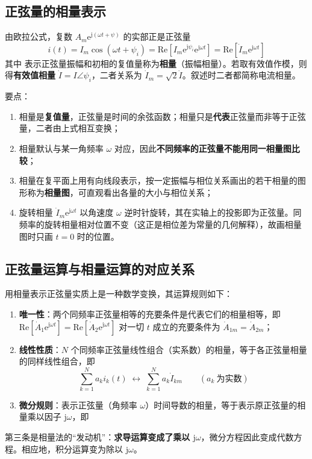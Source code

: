 \subsection{正弦量的相量表示}
由欧拉公式，复数 $A_m\mathrm{e}^{\mathrm{j}(\omega t+\psi)}$ 的实部正是正弦量
\begin{equation}
i(t)=I_m\cos\left(\omega t+\psi_i\right)=\mathrm{Re}\left[I_m\mathrm{e}^{\mathrm{j}\psi_i}\mathrm{e}^{\mathrm{j}\omega t}\right]
=\mathrm{Re}\left[\dot{I}_m\mathrm{e}^{\mathrm{j}\omega t}\right]
\end{equation}
其中
表示正弦量振幅和初相的复值量称为\textbf{相量}（振幅相量）。若取有效值作模，则得\textbf{有效值相量} $\dot{I}=I\angle\psi_i$，二者关系为 $\dot{I}_m=\sqrt{2}\dot{I}$。叙述时二者都简称电流相量。

要点：
\begin{enumerate}
  \item 相量是\textbf{复值量}，正弦量是时间的余弦函数；相量只是\textbf{代表}正弦量而非等于正弦量，二者由上式相互变换；
  \item 相量默认与某一角频率 $\omega$ 对应，因此\textbf{不同频率的正弦量不能用同一相量图比较}；
  \item 相量在复平面上用有向线段表示，按一定振幅与相位关系画出的若干相量的图形称为\textbf{相量图}，可直观看出各量的大小与相位关系；
  \item 旋转相量 $\dot{I}_m\mathrm{e}^{\mathrm{j}\omega t}$ 以角速度 $\omega$ 逆时针旋转，其在实轴上的投影即为正弦量。同频率的旋转相量相对位置不变（这正是相位差为常量的几何解释），故画相量图时只画 $t=0$ 时的位置。
\end{enumerate}

\subsection{正弦量运算与相量运算的对应关系}
用相量表示正弦量实质上是一种数学变换，其运算规则如下：
\begin{enumerate}
  \item \textbf{唯一性}：两个同频率正弦量相等的充要条件是代表它们的相量相等，即 $\mathrm{Re}[\dot{A}_1\mathrm{e}^{\mathrm{j}\omega t}]=\mathrm{Re}[\dot{A}_2\mathrm{e}^{\mathrm{j}\omega t}]$ 对一切 $t$ 成立的充要条件为 $\dot{A}_{1m}=\dot{A}_{2m}$；
  \item \textbf{线性性质}：$N$ 个同频率正弦量线性组合（实系数）的相量，等于各正弦量相量的同样线性组合，即
  \begin{equation}
  \sum_{k=1}^{N}a_ki_k(t)\;\longleftrightarrow\;\sum_{k=1}^{N}a_k\dot{I}_{km}\qquad(a_k\ \text{为实数})
  \end{equation}
  \item \textbf{微分规则}：表示正弦量（角频率 $\omega$）时间导数的相量，等于表示原正弦量的相量乘以因子 $\mathrm{j}\omega$，即
\end{enumerate}
第三条是相量法的“发动机”：\textbf{求导运算变成了乘以 $\mathrm{j}\omega$}，微分方程因此变成代数方程。相应地，积分运算变为除以 $\mathrm{j}\omega$。

